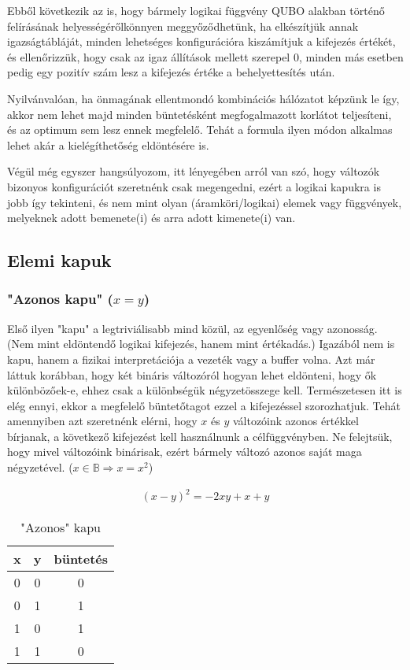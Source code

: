 Ebből következik az is, hogy bármely logikai függvény QUBO alakban történő felírásának helyességérőlkönnyen meggyőződhetünk, ha elkészítjük annak igazságtábláját, minden lehetséges konfigurációra kiszámítjuk a kifejezés értékét, és ellenőrizzük, hogy csak az igaz állítások mellett szerepel 0, minden más esetben pedig egy pozitív szám lesz a kifejezés értéke a behelyettesítés után.

Nyilvánvalóan, ha önmagának ellentmondó kombinációs hálózatot képzünk le így, akkor nem lehet majd minden büntetésként megfogalmazott korlátot teljesíteni, és az optimum sem lesz ennek megfelelő. Tehát a formula ilyen módon alkalmas lehet akár a kielégíthetőség eldöntésére is.

Végül még egyszer hangsúlyozom, itt lényegében arról van szó, hogy változók bizonyos konfigurációt szeretnénk csak megengedni, ezért a logikai kapukra is jobb így tekinteni, és nem mint olyan (áramköri/logikai) elemek vagy függvények, melyeknek adott bemenete(i) és arra adott kimenete(i) van.

\subsection{Elemi kapuk}\label{sec:theoryElementaryGates}

\subsubsection{"Azonos kapu" ($x=y$)}


Első ilyen "kapu" a legtriviálisabb mind közül, az egyenlőség vagy azonosság. (Nem mint eldöntendő logikai kifejezés, hanem mint értékadás.) Igazából nem is kapu, hanem a fizikai interpretációja a vezeték vagy a buffer volna. Azt már láttuk korábban, hogy két bináris változóról hogyan lehet eldönteni, hogy ők különbözőek-e, ehhez csak a különbségük négyzetösszege kell. Természetesen itt is elég ennyi, ekkor a megfelelő büntetőtagot ezzel a kifejezéssel szorozhatjuk. Tehát amennyiben azt szeretnénk elérni, hogy $x$ és $y$ változóink azonos értékkel bírjanak, a következő kifejezést kell használnunk a célfüggvényben. Ne felejtsük, hogy mivel változóink binárisak, ezért bármely változó azonos saját maga négyzetével. ($x \in \mathbb{B} \Rightarrow x = x^2$)

\begin{align}
	(x-y)^2=-2xy+x+y
\end{align}

\begin{table}[ht]
	\footnotesize
	\centering
	\begin{tabular}{ c c c }
		\toprule
		x & y & büntetés \\
		\midrule
		0 & 0 & 0 \\
		0 & 1 & 1 \\
		1 & 0 & 1 \\
		1 & 1 & 0 \\		
		\bottomrule
	\end{tabular}
	\caption{"Azonos" kapu}
	\label{tab:SAMEgate}
\end{table}

